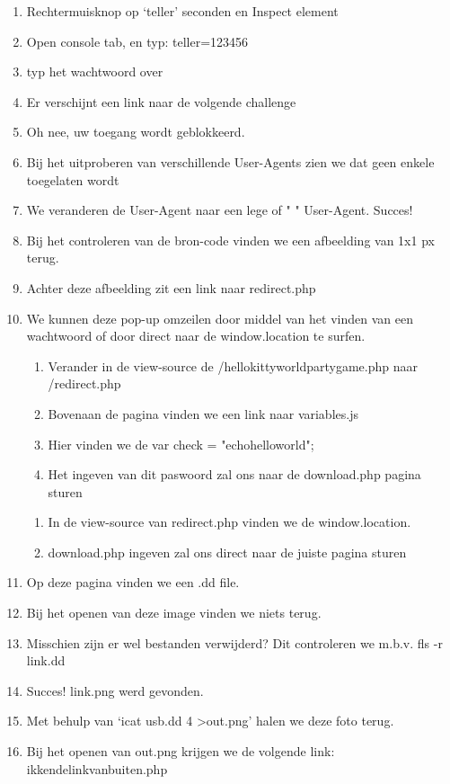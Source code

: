 \begin{enumerate}
\item Rechtermuisknop op `teller' seconden en Inspect element
\item Open console tab, en typ: teller=123456
\item typ het wachtwoord over
\item Er verschijnt een link naar de volgende challenge
\item Oh nee, uw toegang wordt geblokkeerd.
\item Bij het uitproberen van verschillende User-Agents zien we dat geen enkele toegelaten wordt
\item We veranderen de User-Agent naar een lege of " " User-Agent. Succes!
\item Bij het controleren van de bron-code vinden we een afbeelding van 1x1 px terug.
\item Achter deze afbeelding zit een link naar redirect.php
\item We kunnen deze pop-up omzeilen door middel van het vinden van een wachtwoord of door direct naar de window.location te surfen.
\begin{enumerate}
\item Verander in de view-source de /hellokittyworldpartygame.php naar /redirect.php
\item Bovenaan de pagina vinden we een link naar variables.js
\item Hier vinden we de var check = "echohelloworld";
\item Het ingeven van dit paswoord zal ons naar de download.php pagina sturen
\end{enumerate}
\begin{enumerate}
\item In de view-source van redirect.php vinden we de window.location.
\item download.php ingeven zal ons direct naar de juiste pagina sturen
\end{enumerate}
\item Op deze pagina vinden we een .dd file.
\item Bij het openen van deze image vinden we niets terug.
\item Misschien zijn er wel bestanden verwijderd? Dit controleren we m.b.v. fls -r link.dd
\item Succes! link.png werd gevonden.
\item Met behulp van `icat usb.dd 4 \textgreater out.png' halen we deze foto terug.
\item Bij het openen van out.png krijgen we de volgende link: ikkendelinkvanbuiten.php

\end{enumerate}

